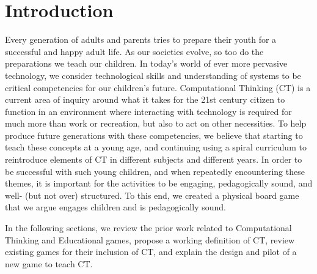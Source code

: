 \documentclass{acm_proc_article-sp}
\begin{document}
\section{Introduction}
\label{sec:intro}
Every generation of adults and parents tries to prepare their youth for a successful and happy adult life. 
As our societies evolve, so too do the preparations we teach our children. 
In today's world of ever more pervasive technology, we consider technological skills and understanding of systems to be critical competencies for our children's future.
Computational Thinking (CT) is a current area of inquiry around what it takes for the 21st century citizen to function in an environment where interacting with technology is required for much more than work or recreation, but also to act on other necessities.
To help produce future generations with these competencies, we believe that starting to teach these concepts at a young age, and continuing using a spiral curriculum \cite{bruner1963process,bruner1966towards} to reintroduce elements of CT in different subjects and different years.
In order to be successful with such young children, and when repeatedly encountering these themes, it is important for the activities to be engaging, pedagogically sound, and well- (but not over) structured.
To this end, we created a physical board game that we argue engages children and is pedagogically sound.

In the following sections, we review the prior work related to Computational Thinking and Educational games, propose a working definition of CT, review existing games for their inclusion of CT, and explain the design and pilot of a new game to teach CT.



\end{document}
